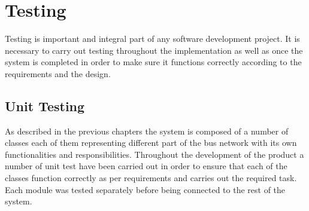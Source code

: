 \chapter{Testing}
Testing is important and integral part of any software development project. It is necessary to carry out testing throughout the implementation as well as once the system is completed in order to make sure it functions correctly according to the requirements and the design.

\section{Unit Testing} 
As described in the previous chapters the system is composed of a number of classes each of them representing different part of the bus network with its own functionalities and responsibilities. Throughout the development of the product a number of unit test have been carried out in order to ensure that each of the classes function correctly as per requirements and carries out the required task. Each module was tested separately before being connected to the rest of the system.

